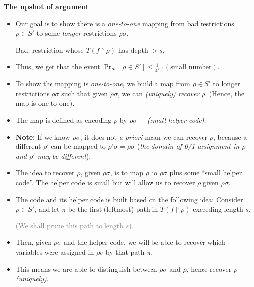 \begin{tcolorbox}[colframe=white, colback=blue!4, boxrule=0mm, sharp corners]
\textbf{The upshot of argument}
\begin{itemize}
    \item Our goal is to show there is a \emph{one-to-one} mapping from bad restrictions \( \rho \in S' \) to some \emph{longer} restrictions \( \rho\sigma \). 

    Bad: restriction whose \( T(f\restriction \rho) \) has depth \( > s \). 
    \item Thus, we get that the event \( \Pr_{\mathcal{R}}[ \rho \in S' ] \leq \frac{1}{4^s} \cdot (\text{small number}) \).
    
    \item To show the mapping is \emph{one-to-one}, we build a map from \( \rho \in S' \) to longer restrictions \( \rho\sigma \) such that given \( \rho\sigma \), we can \emph{(uniquely) recover} \( \rho \). (Hence, the map is one-to-one).
    
    \item The map is defined as encoding \( \rho \) by \( \rho\sigma \) + \emph{(small helper code)}.

    \item \textbf{Note:} If we know \( \rho\sigma \), it does not \emph{a priori} mean we can recover \( \rho \), because a different \( \rho' \) can be mapped to \( \rho'\sigma = \rho\sigma \) (\emph{the domain of 0/1 assignment in \( \rho \) and \( \rho' \) may be different}).
    
    \item The idea to recover \( \rho \), given \( \rho\sigma \), is to map \( \rho \) to \( \rho\sigma \) plus some ``small helper code''. The helper code is small but will allow us to recover \( \rho \) given \( \rho\sigma \).

    \item The code and its helper code is built based on the following idea: Consider \( \rho \in S' \), and let \( \pi \) be the first (leftmost) path in \( T(f \restriction \rho) \) exceeding length \( s \). 
    
    \textcolor{gray}{(We shall prune this path to length \( s \)).}
\end{itemize}

\begin{itemize}
    \item Then, given \( \rho\sigma \) and the helper code, we will be able to recover which variables were assigned in \( \rho\sigma \) by that path \( \pi \).
    
    \item This means we are able to distinguish between \( \rho\sigma \) and \( \rho \), hence recover \( \rho \) \emph{(uniquely)}.
\end{itemize}
\end{tcolorbox}

